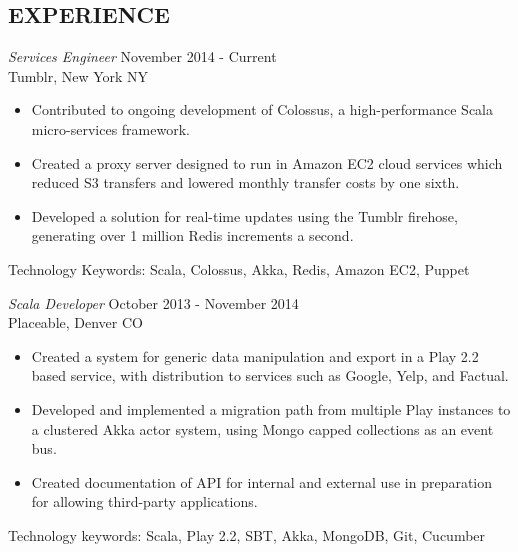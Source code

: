 \documentclass[line,margin]{res}
\begin{document}
\address{720-301-4407 / zoe@zgagnon.com}
\address{Twitter: @ZoeCraftsCode}

 
\begin{resume}
 

 
\section{EXPERIENCE}
{\sl Services Engineer} \hfill November 2014 - Current\\
Tumblr, New York NY
\begin{itemize}
\item Contributed to ongoing development of Colossus, a high-performance Scala micro-services 
framework.
\item Created a proxy server designed to run in Amazon EC2 cloud services which reduced S3 transfers and lowered monthly transfer costs by one sixth.
\item Developed a solution for real-time updates using the Tumblr firehose, generating over 1 million Redis increments a second.
\end{itemize}
Technology Keywords: Scala, Colossus, Akka, Redis, Amazon EC2, Puppet

{\sl Scala Developer} \hfill October 2013 - November 2014\\
Placeable, Denver CO
\begin{itemize} 
\item Created a system for generic data manipulation and export in a Play 2.2 based service, with distribution to services such as Google, Yelp, and Factual.
\item Developed and implemented a migration path from multiple Play instances to a clustered Akka actor system, using Mongo
capped collections as an event bus.
\item Created documentation of API for internal and external use in preparation for allowing third-party applications.
\end{itemize}
Technology keywords: Scala, Play 2.2, SBT, Akka, MongoDB, Git, Cucumber


\end{resume}
\end{document}
